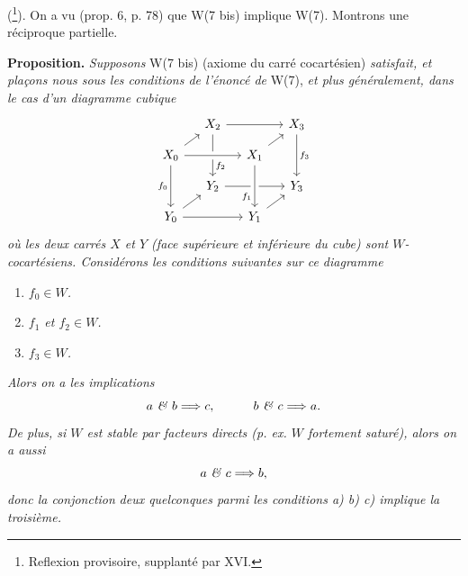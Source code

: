 \documentclass[11pt]{article}
\begin{document}
(\footnote[135]{Reflexion provisoire, supplanté par XVI.}). On a vu (prop. 6, p. 78) que W(7 bis) implique W(7). Montrons une réciproque partielle. %

\textbf{Proposition.} \textit{Supposons} W(7 bis) (axiome du carré cocartésien) \textit{satisfait, et plaçons nous sous les conditions de l'énoncé de} W(7), \textit{et plus généralement, dans le cas d'un diagramme cubique}
\[
\begin{tikzcd}[row sep=small, column sep=small]
 & X_2 \arrow[rr] \arrow[dd, "f_2" near end] & & X_3 \arrow[dd, "f_3"] \\
X_0 \arrow[ur] \arrow[rr, crossing over] \arrow[dd, "f_0"'] & & X_1 \arrow[ur] & \\
 & Y_2 \arrow[rr] & & Y_3 \\
Y_0 \arrow[ur] \arrow[rr] & & Y_1 \arrow[ur] \arrow[from=uu, crossing over, "f_1"' near end] &
\end{tikzcd}
\]
\textit{où les deux carrés $X$ et $Y$ (face supérieure et inférieure du cube) sont $W$-cocartésiens. Considérons les conditions suivantes sur ce diagramme}
\begin{enumerate}[label={}]
\item[\textit{a)}] \textit{$f_0 \in W$.}
\item[\textit{b)}] \textit{$f_1$ et $f_2 \in W$.}
\item[\textit{c)}] \textit{$f_3 \in W$.}
\end{enumerate}
\textit{Alors on a les implications}
\[
a \text{ \textit{\&} } b \Longrightarrow c, \qquad\quad b \text{ \textit{\&} } c \Longrightarrow a.
\]
\textit{De plus, si $W$ est stable par facteurs directs (p. ex. $W$ fortement saturé), alors on a aussi}
\[
a \text{ \textit{\&} } c \Longrightarrow b,
\]
\textit{donc la conjonction} \textit{deux quelconques parmi les conditions a) b) c) implique la troisième.}
\end{document}
